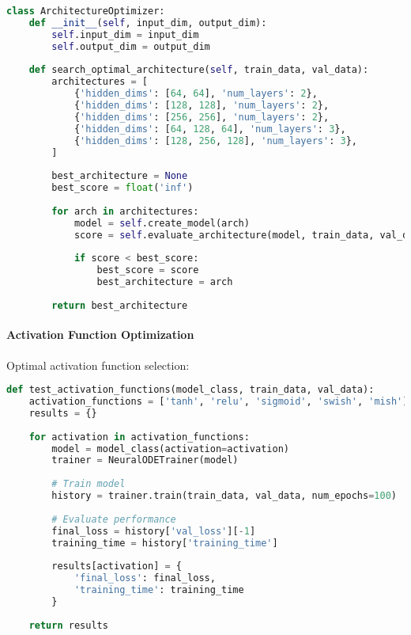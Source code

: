 \begin{lstlisting}[language=python, caption=Architecture Search]
class ArchitectureOptimizer:
    def __init__(self, input_dim, output_dim):
        self.input_dim = input_dim
        self.output_dim = output_dim
    
    def search_optimal_architecture(self, train_data, val_data):
        architectures = [
            {'hidden_dims': [64, 64], 'num_layers': 2},
            {'hidden_dims': [128, 128], 'num_layers': 2},
            {'hidden_dims': [256, 256], 'num_layers': 2},
            {'hidden_dims': [64, 128, 64], 'num_layers': 3},
            {'hidden_dims': [128, 256, 128], 'num_layers': 3},
        ]
        
        best_architecture = None
        best_score = float('inf')
        
        for arch in architectures:
            model = self.create_model(arch)
            score = self.evaluate_architecture(model, train_data, val_data)
            
            if score < best_score:
                best_score = score
                best_architecture = arch
        
        return best_architecture
\end{lstlisting}

\paragraph{Activation Function Optimization}
Optimal activation function selection:

\begin{lstlisting}[language=python, caption=Activation Function Optimization]
def test_activation_functions(model_class, train_data, val_data):
    activation_functions = ['tanh', 'relu', 'sigmoid', 'swish', 'mish']
    results = {}
    
    for activation in activation_functions:
        model = model_class(activation=activation)
        trainer = NeuralODETrainer(model)
        
        # Train model
        history = trainer.train(train_data, val_data, num_epochs=100)
        
        # Evaluate performance
        final_loss = history['val_loss'][-1]
        training_time = history['training_time']
        
        results[activation] = {
            'final_loss': final_loss,
            'training_time': training_time
        }
    
    return results
\end{lstlisting}

